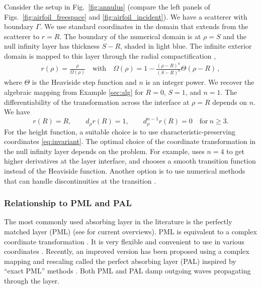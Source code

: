 \documentclass[onefignum,onetabnum]{siamart190516}
\begin{document}
Consider the setup in Fig.~\ref{fig:annulus} (compare the left panels of Figs.~\ref{fig:airfoil_freespace} and \ref{fig:airfoil_incident}). We have a scatterer with boundary $\Gamma$. We use standard coordinates in the domain that extends from the scatterer to $r=R$. The boundary of the numerical domain is at $\rho=S$ and the null infinity layer has thickness $S-R$, shaded in light blue. The infinite exterior domain is mapped to this layer through the radial compactification  \cite{ZENGINOGLU20112286},
\begin{align}\label{eq:layer}
r(\rho)=\frac{\rho}{\Omega(\rho)} \quad \mathrm{with} \quad \Omega(\rho) = 1 - \frac{(\rho-R)^n}{(S-R)^n}\Theta(\rho-R)\,,
\end{align}
where $\Theta$ is the Heaviside step function and $n$ is an integer power. We recover the algebraic mapping from Example \ref{sec:alg} for $R=0$, $S=1$, and $n=1$. The differentiability of the transformation across the interface at $\rho=R$ depends on $n$. We have
\[ r(R) = R, \qquad d_\rho r(R) = 1, \qquad d_\rho^{n-1} r(R) = 0 \quad \mathrm{for} \ n\geq 3. \] 
For the height function, a suitable choice is to use characteristic-preserving coordinates \eqref{eq:invariant}. The optimal choice of the coordinate transformation in the null infinity layer depends on the problem. For example, \cite{bernuzzi2011binary} uses $n=4$ to get higher derivatives at the layer interface, and \cite{hilditch2018evolution} chooses a smooth transition function instead of the Heaviside function. Another option is to use numerical methods that can handle discontinuities at the transition \cite{vishal2024toward}.

\subsubsection{Relationship to PML and PAL}
The most commonly used absorbing layer in the literature is the perfectly matched layer (PML) \cite{BERENGER1994185} (see \cite{joly2012elementary, halla2019analysis, pled_review_2022} for current overviews). PML is equivalent to a complex coordinate transformation \cite{chew19943d}. It is very flexible and convenient to use in various coordinates \cite{collino1998perfectly}. Recently, an improved version has been proposed using a complex mapping and rescaling called the perfect absorbing layer (PAL) \cite{wang2017perfect, yang2021truly} inspired by ``exact PML'' methods \cite{hugonin2005perfectly, bermudez2008exact}. Both PML and PAL damp outgoing waves propagating through the layer.
\end{document}
